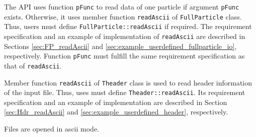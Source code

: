 \begin{itemize}
The API uses function \texttt{pFunc} to read data of one particle if argument \texttt{pFunc} exists. Otherwise, it uses member function \texttt{readAscii} of \texttt{FullParticle} class. Thus, users must define \texttt{FullParticle::readAscii} if required. The requirement specification and an example of implementation of \texttt{readAscii} are described in Sections \ref{sec:FP_readAscii} and  \ref{sec:example_userdefined_fullparticle_io}, respectively. Function \texttt{pFunc} must fulfill the same requirement specification as that of \texttt{readAscii}.

Member function \texttt{readAscii} of \texttt{Theader} class is used to read header information of the input file. Thus, uses must define \texttt{Theader::readAscii}. Its requirement specification and an example of implementation are described in Section \ref{sec:Hdr_readAscii} and \ref{sec:example_userdefined_header}, respectively.

Files are opened in ascii mode.

\end{itemize}


\label{sec:readParticleBinary}


